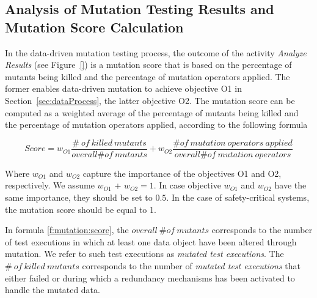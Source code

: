 
\newcommand{\ONMO}{\mathit{overall}\ \# \mathit{of}\ \mathit{mutation} \ \mathit{operators}}
\newcommand{\NMOA}{\# \mathit{of}\ \mathit{mutation} \ \mathit{operators} \ \mathit{applied}}


\subsection{Analysis of Mutation Testing Results and Mutation Score Calculation}
\label{sec:data:mutationscore}

In the data-driven mutation testing process, the outcome of the activity \emph{Analyze Results} (see Figure~\ref{}) is a mutation score that is based on
the percentage of mutants being killed and the percentage of mutation operators applied. 
The former enables data-driven mutation to achieve objective O1 in Section~\ref{sec:dataProcess}, the latter objective O2. 
The mutation score can be computed as a weighted average of the percentage of mutants being killed and the percentage of mutation operators applied, according to the following formula

\begin{equation}
Score=w_{O1} \frac{\# \ \mathit{of}\ \mathit{killed} \ \mathit{mutants}}{\mathit{overall} \# \mathit{of}\ \mathit{mutants}} + w_{O2} \frac{\# \mathit{of}\ \mathit{mutation} \ \mathit{operators} \ \mathit{applied}}{\mathit{overall} \# \mathit{of}\ \mathit{mutation} \ \mathit{operators}}
\label{f:mutation:score}
\end{equation}

Where $w_{O1}$ and $w_{O2}$ capture the importance of the objectives O1 and O2, respectively. We assume $w_{O1}$ + $w_{O2} = 1$. In case objective $w_{O1}$ and $w_{O2}$ have the same importance, they should be set to $0.5$. In the case of safety-critical systems, the mutation score should be equal to 1.

In formula \ref{f:mutation:score}, the $\mathit{overall}\ \# \mathit{of}\ \mathit{mutants}$ corresponds to the number of test executions in which at least one data object have been altered through mutation. We refer to such test executions as \emph{mutated test executions}.
The $\# \ \mathit{of}\ \mathit{killed} \ \mathit{mutants}$ corresponds to the number of \emph{mutated test executions} that either failed or during which a redundancy mechanisms has been activated to handle the mutated data.

